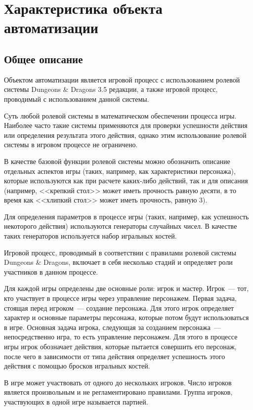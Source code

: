 \section{Характеристика объекта автоматизации}


\subsection{Общее описание}

Объектом автоматизации является игровой процесс с использованием ролевой системы Dungeons \& Dragons 3.5 редакции, а также игровой процесс, проводимый с использованием данной системы.

Суть любой ролевой системы в математическом обеспечении процесса игры. Наиболее часто такие системы применяются для проверки успешности действия или определения результата этого действия, однако этим использование ролевой системы в игровом процессе не ограничено.

В качестве базовой функции ролевой системы можно обозначить описание отдельных аспектов игры (таких, например, как характеристики персонажа), которые используются как при расчете каких-либо действий, так и для описания (например, <<крепкий стол>> может иметь прочность равную десяти, в то время как <<хлипкий стол>> может иметь прочность, равную 3).

Для определения параметров в процессе игры (таких, например, как успешность некоторого действия) используются генераторы случайных чисел. В качестве таких генераторов используется набор игральных костей.

Игровой процесс, проводимый в соответствии с правилами ролевой системы Dungeons \& Dragons, включает в себя несколько стадий и определяет роли участников в данном процессе.

Для каждой игры определены две основные роли: игрок и мастер. Игрок~--- тот, кто участвует в процессе игры через управление персонажем. Первая задача, стоящая перед игроком~--- создание персонажа. Для этого игрок определяет характер и основные параметры персонажа, которые потом будут использоваться в игре. Основная задача игрока, следующая за созданием персонажа~--- непосредственно игра, то есть управление персонажем. Для этого в процессе игры игрок обозначает действия, которые пытается совершить его персонаж, после чего в зависимости от типа действия определяет успешность этого действия с помощью бросков игральных костей.

В игре может участвовать от одного до нескольких игроков. Число игроков является произвольным и не регламентировано правилами. Группа игроков, участвующих в одной игре называется партией.

